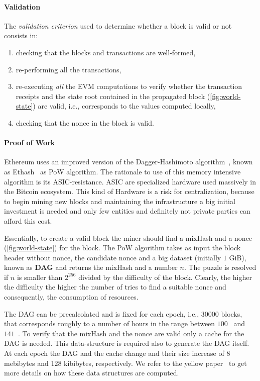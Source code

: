 \paragraph{Validation}
The \emph{validation criterion} used to determine whether a block is valid or
not consists in:
\begin{enumerate}
    \item checking that the blocks and transactions are well-formed,
    \item re-performing all the transactions,
    \item re-executing \emph{all} the EVM computations to verify whether the
    transaction receipts and the state root contained in the propagated block
    (\autoref{fig:world-state}) are valid, i.e., corresponds to the values
    computed locally,
    \item checking that the nonce in the block is valid.
\end{enumerate}

\paragraph{Proof of Work}
Ethereum uses an improved version of the
Dagger-Hashimoto algorithm~\cite{bib:dagger-hashimoto}, known as
Ethash~\cite[Appendix J]{wood2018ethereum} as PoW algorithm.
The rationale to use of this memory intensive algorithm is its
ASIC-resistance. ASIC are specialized hardware used massively in the Bitcoin
ecosystem. This kind of Hardware is a risk for centralization,
because to begin mining new blocks and maintaining the infrastructure a big
initial investment is needed and only few entities and definitely not private
parties can afford this cost.

Essentially, to create a valid block the miner should find a mixHash and
a nonce (\autoref{fig:world-state}) for the block.
The PoW algorithm takes as input the block header without nonce,
the candidate nonce and a big dataset (initially $1$ GiB), known as
\textbf{DAG} and returns the mixHash and a number $n$. The puzzle is resolved if
$n$ is smaller than $2^{256}$ divided by the difficulty of the block. Clearly,
the higher the difficulty the higher the number of tries to find a suitable
nonce and consequently, the consumption of resources.

The DAG can be precalcolated and is fixed for each epoch, i.e.,
$30000$ blocks, that corresponds roughly to a number of hours in the range
between $100$~\cite{bib:ethereum-wiki-mining} and
$141$~\cite{bib:solidity-docs}. To verify that the mixHash and the nonce are
valid only a cache for the DAG is needed. This data-structure is required also
to generate the DAG itself. At each epoch the DAG and the cache change and
their size increase of $8$ mebibytes and $128$ kibibytes, respectively.
We refer to the yellow paper~\cite[Appendix J]{wood2018ethereum} to get more
details on how these data structures are computed.



